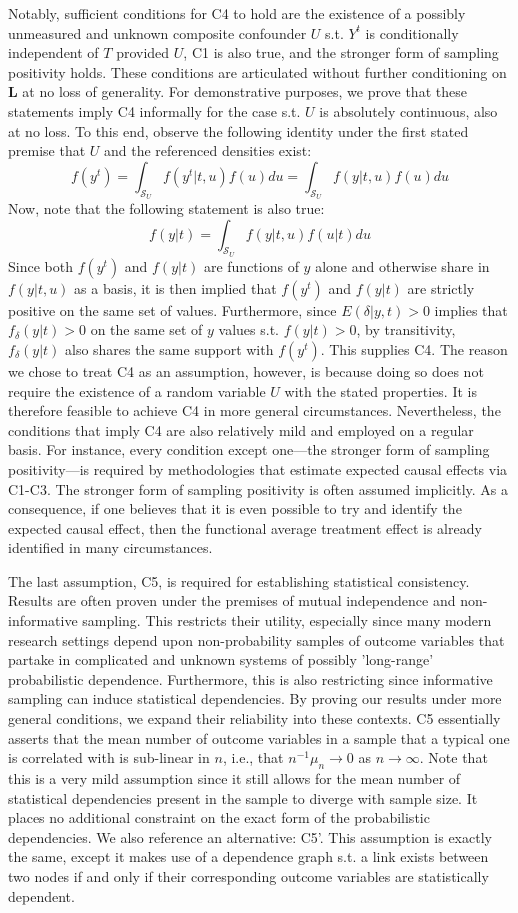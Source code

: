 \documentclass[12pt]{amsart}
\theoremstyle{plain}%
\theoremstyle{definition}
\theoremstyle{remark}
\numberwithin{equation}{section}
\begin{document}
Notably, sufficient conditions for C4 to hold are the existence of a possibly unmeasured and unknown composite confounder $U$ s.t. $Y^t$ is conditionally independent of $T$ provided $U$, C1 is also true, and the stronger form of sampling positivity holds. These conditions are articulated without further conditioning on $\mathbf{L}$ at no loss of generality. For demonstrative purposes, we prove that these statements imply C4 informally for the case s.t. $U$ is absolutely continuous, also at no loss. To this end, observe the following identity under the first stated premise that $U$ and the referenced densities exist:
$$f(y^{t}) = \int_{\mathcal{S}_U} f(y^{t} | t, u) f(u) du = \int_{\mathcal{S}_U} f(y | t, u) f(u) du$$
Now, note that the following statement is also true:
$$f(y|t) = \int_{\mathcal{S}_U} f(y| t, u) f(u | t)du$$
Since both $f(y^t)$ and $f(y|t)$ are functions of $y$ alone and otherwise share in $f(y| t, u)$ as a basis, it is then implied that $f(y^t)$ and $f(y|t)$ are strictly positive on the same set of values. Furthermore, since $E(\delta | y, t) > 0$ implies that $f_{\delta}(y|t) > 0$ on the same set of $y$ values s.t. $f(y|t) > 0$, by transitivity, $f_{\delta}(y|t)$ also shares the same support with $f(y^t)$. This supplies C4. The reason we chose to treat C4 as an assumption, however, is because doing so does not require the existence of a random variable $U$ with the stated properties. It is therefore feasible to achieve C4 in more general circumstances. Nevertheless, the conditions that imply C4 are also relatively mild and employed on a regular basis. For instance, every condition except one---the stronger form of sampling positivity---is required by methodologies that estimate expected causal effects via C1-C3. The stronger form of sampling positivity is often assumed implicitly. As a consequence, if one believes that it is even possible to try and identify the expected causal effect, then the functional average treatment effect is already identified in many circumstances.

The last assumption, C5, is required for establishing statistical consistency. Results are often proven under the premises of mutual independence and non-informative sampling. This restricts their utility, especially since many modern research settings depend upon non-probability samples of outcome variables that partake in complicated and unknown systems of possibly 'long-range' probabilistic dependence. Furthermore, this is also restricting since informative sampling can induce statistical dependencies. By proving our results under more general conditions, we expand their reliability into these contexts. C5 essentially asserts that the mean number of outcome variables in a sample that a typical one is correlated with is sub-linear in $n$, i.e., that $n^{-1} \mu_n \to 0$ as $n \to \infty$. Note that this is a very mild assumption since it still allows for the mean number of statistical dependencies present in the sample to diverge with sample size. It places no additional constraint on the exact form of the probabilistic dependencies. We also reference an alternative: C5'. This assumption is exactly the same, except it makes use of a dependence graph s.t. a link exists between two nodes if and only if their corresponding outcome variables are statistically dependent.
\end{document}
